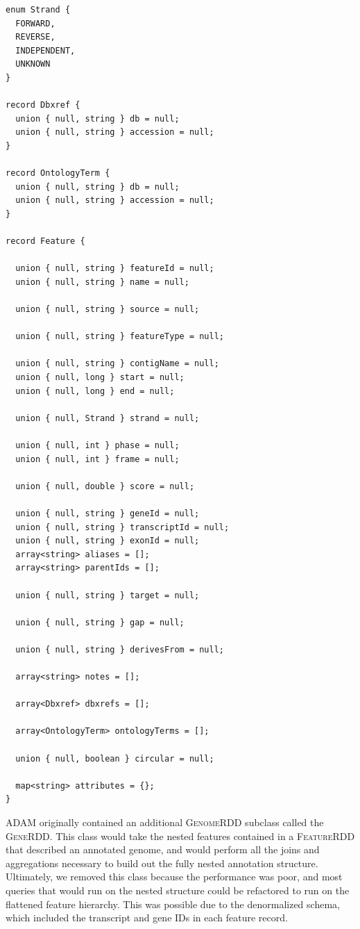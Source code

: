 \documentclass[phd]{ucbthesis}
\begin{document}
\begin{lstlisting}[caption=\textsc{ADAM}'s feature schemas]
enum Strand {
  FORWARD,
  REVERSE,
  INDEPENDENT,
  UNKNOWN
}

record Dbxref {
  union { null, string } db = null;
  union { null, string } accession = null;
}

record OntologyTerm {
  union { null, string } db = null;
  union { null, string } accession = null;
}

record Feature {

  union { null, string } featureId = null;
  union { null, string } name = null;

  union { null, string } source = null;

  union { null, string } featureType = null;

  union { null, string } contigName = null;
  union { null, long } start = null;
  union { null, long } end = null;

  union { null, Strand } strand = null;

  union { null, int } phase = null;
  union { null, int } frame = null;

  union { null, double } score = null;

  union { null, string } geneId = null;
  union { null, string } transcriptId = null;
  union { null, string } exonId = null;
  array<string> aliases = [];
  array<string> parentIds = [];

  union { null, string } target = null;

  union { null, string } gap = null;

  union { null, string } derivesFrom = null;

  array<string> notes = [];

  array<Dbxref> dbxrefs = [];

  array<OntologyTerm> ontologyTerms = [];

  union { null, boolean } circular = null;

  map<string> attributes = {};
}
\end{lstlisting}

\textsc{ADAM} originally contained an additional \textsc{GenomeRDD} subclass
called the \textsc{GeneRDD}. This class would take the nested features contained
in a \textsc{FeatureRDD} that described an annotated genome, and would perform
all the joins and aggregations necessary to build out the fully nested
annotation structure. Ultimately, we removed this class because the performance
was poor, and most queries that would run on the nested structure could be
refactored to run on the flattened feature hierarchy. This was possible due to
the denormalized schema, which included the transcript and gene IDs in each
feature record.
\end{document}
